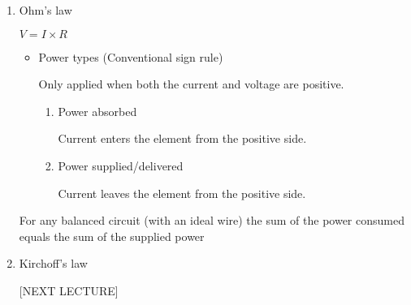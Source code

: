 \documentclass[11pt]{article}
\begin{document}
\begin{enumerate}
\item Ohm's law

\(V = I \times R\)

\begin{itemize}
\item Power types (Conventional sign rule)

Only applied when both the current and voltage are positive.

\begin{enumerate}
\item Power absorbed

Current enters the element from the positive side.

\item Power supplied/delivered

Current leaves the element from the positive side.
\end{enumerate}
\end{itemize}

For any balanced circuit (with an ideal wire) the sum of the power consumed equals the sum of the supplied power

\item Kirchoff's law

[NEXT LECTURE]
\end{enumerate}
\end{document}
